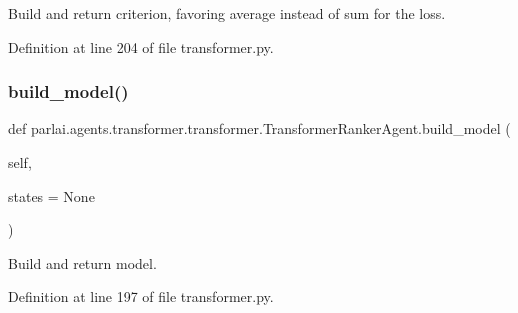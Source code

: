 \begin{DoxyVerb}Build and return criterion, favoring average instead of sum for the loss.\end{DoxyVerb}
 

Definition at line 204 of file transformer.\+py.

\mbox{\label{classparlai_1_1agents_1_1transformer_1_1transformer_1_1TransformerRankerAgent_a3336fdab2d667e6e631135ec70e8558f}} 
\subsubsection{\texorpdfstring{build\+\_\+model()}{build\_model()}}
{\footnotesize\ttfamily def parlai.\+agents.\+transformer.\+transformer.\+Transformer\+Ranker\+Agent.\+build\+\_\+model (\begin{DoxyParamCaption}\item[{}]{self,  }\item[{}]{states = {\ttfamily None} }\end{DoxyParamCaption})}

\begin{DoxyVerb}Build and return model.\end{DoxyVerb}
 

Definition at line 197 of file transformer.\+py.



